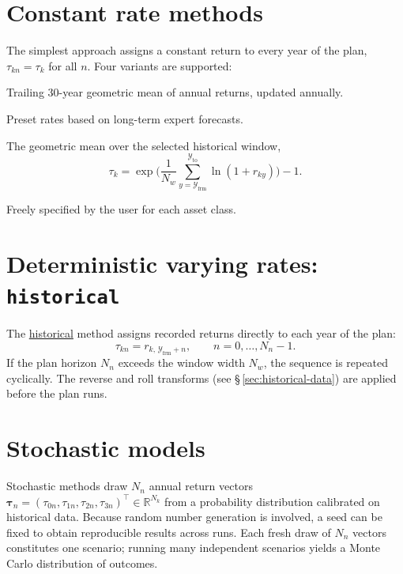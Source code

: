 \documentclass[fleqn,12pt]{report}
\newcommand{\code}[1]{\url{#1}}
\begin{document}
\section{Constant rate methods}

The simplest approach assigns a constant return to every year of the plan,
$\tau_{kn} = \tau_k$ for all $n$.
Four variants are supported:
\begin{description}[leftmargin=4em,style=nextline]
\item [\texttt{trailing\_30}]
    Trailing 30-year geometric mean of annual returns, updated annually.
\item [\texttt{conservative} and \texttt{optimistic}]
    Preset rates based on long-term expert forecasts.
\item [\texttt{historical\_average}]
    The geometric mean over the selected historical window,
    \begin{equation}
        \tau_k = \exp\biggl(\frac{1}{N_w}\sum_{y=\mathcal{Y}_{\mathrm{frm}}}^{\mathcal{Y}_{\mathrm{to}}}
                 \ln(1 + r_{ky})\biggr) - 1.
    \end{equation}
\item [\texttt{user}]
    Freely specified by the user for each asset class.
\end{description}

\section{Deterministic varying rates: \texttt{historical}}

The \code{historical} method assigns recorded returns directly to each year
of the plan:
\begin{equation}
    \tau_{kn} = r_{k,\,\mathcal{Y}_{\mathrm{frm}}+n},
    \qquad n = 0, \ldots, N_n - 1.
\end{equation}
If the plan horizon $N_n$ exceeds the window width $N_w$, the sequence is
repeated cyclically.
The reverse and roll transforms (see \S\,\ref{sec:historical-data}) are applied
before the plan runs.

\section{Stochastic models}

Stochastic methods draw $N_n$ annual return vectors
$\bm{\tau}_n = (\tau_{0n}, \tau_{1n}, \tau_{2n}, \tau_{3n})^\top \in \mathbb{R}^{N_k}$
from a probability distribution calibrated on historical data.
Because random number generation is involved, a seed can be fixed to obtain
reproducible results across runs.
Each fresh draw of $N_n$ vectors constitutes one scenario; running many
independent scenarios yields a Monte Carlo distribution of outcomes.
\end{document}
